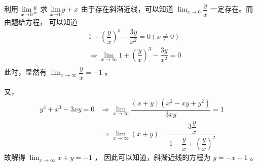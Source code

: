 \begin{answer}[C2T11]{利用 $ {\displaystyle\lim_{x\rightarrow 0}}\frac{y}{x} $ 求 $ {\displaystyle\lim_{x\rightarrow 0}}y+x $ }
    由于存在斜渐近线，可以知道 $ {\displaystyle\lim_{x\rightarrow 0}}\dfrac{y}{x} $ 一定存在。而由题给方程，
    可以知道\begin{equation*}
        \begin{aligned}
            &1+(\dfrac{y}{x})^3 - \dfrac{3y}{x^2} = 0 (x\neq 0)\\ &\Rightarrow
            {\displaystyle\lim_{x\rightarrow \infty}}1+(\dfrac{y}{x})^3 - \dfrac{3y}{x^2} = 0 \\
        \end{aligned}
    \end{equation*}
    此时，显然有 $ {\displaystyle\lim_{x\rightarrow \infty}}\dfrac{y}{x} = -1 $ 。

    又，\begin{equation*}
        \begin{aligned}
            y^3+x^3-3xy = 0&\Rightarrow {\displaystyle\lim_{x\rightarrow \infty}}
            \dfrac{(x+y)(x^2 - xy + y^2)}{3xy} = 1 \\ &\Rightarrow
            {\displaystyle\lim_{x\rightarrow \infty}}(x+y) = 
            \dfrac{3\dfrac{y}{x}}{1 - \dfrac{y}{x} + (\dfrac{y}{x})^2}            
        \end{aligned}
    \end{equation*}
    故解得 $ {\displaystyle\lim_{x\rightarrow \infty}}x+y = -1 $ ，
    因此可以知道，斜渐近线的方程为 $ y = -x-1 $ 。
\end{answer}

\begin{answer}[C2T17]{}

\end{answer}

\begin{answer}[C2T20]{}

\end{answer}

\begin{answer}[C2T21]{}

\end{answer}

\begin{answer}[C2T22]{}

\end{answer}
